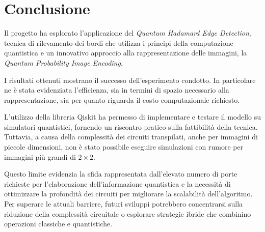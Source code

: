 \section{Conclusione}\label{sec:conclusione}

Il progetto ha esplorato l'applicazione del \emph{Quantum Hadamard Edge
Detection}, tecnica di rilevamento dei bordi che utilizza i principi della
computazione quantistica e un innovativo approccio alla rappresentazione delle
immagini, la \emph{Quantum Probability Image Encoding}.

I risultati ottenuti mostrano il successo dell'esperimento condotto. In
particolare ne è stata evidenziata l'efficienza, sia in termini di spazio
necessario alla rappresentazione, sia per quanto riguarda il costo
computazionale richiesto.

L’utilizzo della libreria Qiskit ha permesso di implementare e testare il
modello su simulatori quantistici, fornendo un riscontro pratico sulla
fattibilità della tecnica. Tuttavia, a causa della complessità dei circuiti
transpilati, anche per immagini di piccole dimensioni, non è stato possibile
eseguire simulazioni con rumore per immagini più grandi di $2\times2$. 

Questo limite evidenzia la sfida rappresentata dall’elevato numero di porte
richieste per l’elaborazione dell’informazione quantistica e la necessità di
ottimizzare la profondità dei circuiti per migliorare la scalabilità
dell’algoritmo. Per superare le attuali barriere, futuri sviluppi potrebbero
concentrarsi sulla riduzione della complessità circuitale o esplorare strategie
ibride che combinino operazioni classiche e quantistiche.
